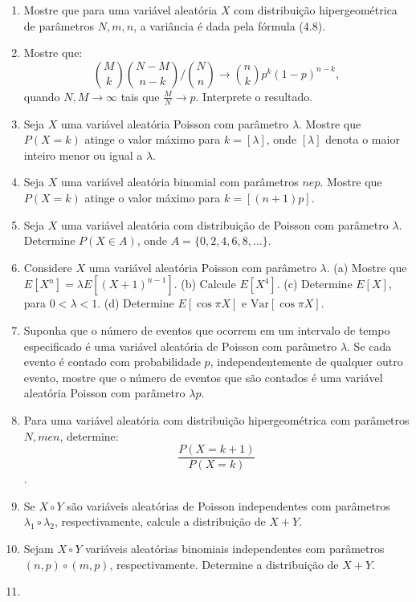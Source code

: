 \documentclass[
  10pt,
]{article}
\begin{document}
\begin{enumerate}
\def\labelenumi{\arabic{enumi}.}
\setcounter{enumi}{18}
\item
  Mostre que para uma variável aleatória \(X\) com distribuição
  hipergeométrica de parâmetros \(N, m, n\), a variância é dada pela
  fórmula (4.8).
\item
  Mostre que:
  \[ \binom{M}{k} \binom{N - M}{n - k} / \binom{N}{n} \to \binom{n}{k} p^k (1 - p)^{n - k}, \]
  quando \(N, M \to \infty\) tais que \(\frac{M}{N} \to p\). Interprete
  o resultado.
\item
  Seja \(X\) uma variável aleatória Poisson com parâmetro \(\lambda\).
  Mostre que \(P(X = k)\) atinge o valor máximo para \(k = [\lambda]\),
  onde \([\lambda]\) denota o maior inteiro menor ou igual a
  \(\lambda\).
\item
  Seja \(X\) uma variável aleatória binomial com parâmetros \(n e p\).
  Mostre que \(P(X = k)\) atinge o valor máximo para \(k = [(n + 1)p]\).
\item
  Seja \(X\) uma variável aleatória com distribuição de Poisson com
  parâmetro \(\lambda\). Determine \(P(X \in A)\), onde
  \(A = \{0, 2, 4, 6, 8, \ldots\}\).
\item
  Considere \(X\) uma variável aleatória Poisson com parâmetro
  \(\lambda\). (a) Mostre que \(E[X^n] = \lambda E[(X + 1)^{n-1}]\). (b)
  Calcule \(E[X^4]\). (c) Determine \(E[X]\), para \(0 < \lambda < 1\).
  (d) Determine \(E[\cos \pi X]\) e \(\text{Var}[\cos \pi X]\).
\item
  Suponha que o número de eventos que ocorrem em um intervalo de tempo
  especificado é uma variável aleatória de Poisson com parâmetro
  \(\lambda\). Se cada evento é contado com probabilidade \(p\),
  independentemente de qualquer outro evento, mostre que o número de
  eventos que são contados é uma variável aleatória Poisson com
  parâmetro \(\lambda p\).
\item
  Para uma variável aleatória com distribuição hipergeométrica com
  parâmetros \(N, m e n\), determine: \[ \frac{P(X = k+1)}{P(X = k)} \].
\item
  Se \(X \circ Y\) são variáveis aleatórias de Poisson independentes com
  parâmetros \(\lambda_1 \circ \lambda_2\), respectivamente, calcule a
  distribuição de \(X + Y\).
\item
  Sejam \(X \circ Y\) variáveis aleatórias binomiais independentes com
  parâmetros \((n, p) \circ (m, p)\), respectivamente. Determine a
  distribuição de \(X + Y\).
\item

\end{enumerate}
\end{document}
